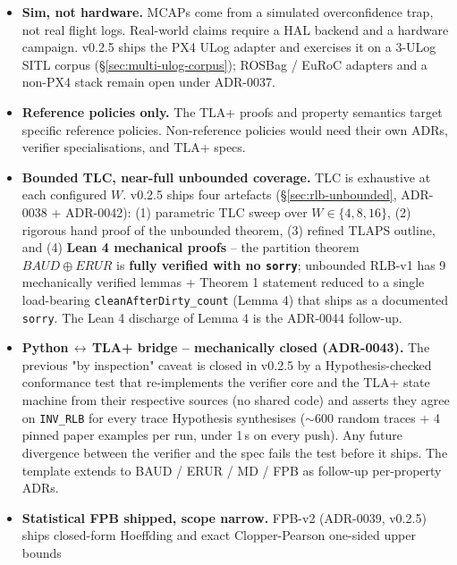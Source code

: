 \documentclass[acmsmall,nonacm=true,review=false]{acmart}
\theoremstyle{plain}
\begin{document}
\begin{itemize}
  \item \textbf{Sim, not hardware.} MCAPs come from a simulated
        overconfidence trap, not real flight logs. Real-world
        claims require a HAL backend and a hardware campaign.
        v0.2.5 ships the PX4 ULog adapter and exercises it on a
        3-ULog SITL corpus (\S\ref{sec:multi-ulog-corpus});
        ROSBag / EuRoC adapters and a non-PX4 stack remain open
        under ADR-0037.
  \item \textbf{Reference policies only.} The TLA+ proofs and
        property semantics target specific reference policies.
        Non-reference policies would need their own ADRs, verifier
        specialisations, and TLA+ specs.
  \item \textbf{Bounded TLC, near-full unbounded coverage.}
        TLC is exhaustive at each configured $W$. v0.2.5 ships
        four artefacts (\S\ref{sec:rlb-unbounded}, ADR-0038 +
        ADR-0042): (1) parametric TLC sweep over
        $W \in \{4, 8, 16\}$, (2) rigorous hand proof of the
        unbounded theorem, (3) refined TLAPS outline, and (4)
        \textbf{Lean 4 mechanical proofs} -- the partition theorem
        $\mathit{BAUD} \oplus \mathit{ERUR}$ is \textbf{fully
        verified with no \texttt{sorry}}; unbounded RLB-v1 has 9
        mechanically verified lemmas + Theorem 1 statement
        reduced to a single load-bearing
        \texttt{cleanAfterDirty\_count} (Lemma 4) that ships as a
        documented \texttt{sorry}. The Lean 4 discharge of Lemma
        4 is the ADR-0044 follow-up.
  \item \textbf{Python\,$\leftrightarrow$\,TLA+ bridge --
        mechanically closed (ADR-0043).} The previous "by
        inspection" caveat is closed in v0.2.5 by a
        Hypothesis-checked conformance test that re-implements
        the verifier core and the TLA+ state machine from their
        respective sources (no shared code) and asserts they
        agree on \texttt{INV\_RLB} for every trace Hypothesis
        synthesises ($\sim$600 random traces + 4 pinned paper
        examples per run, under 1\,s on every push). Any future
        divergence between the verifier and the spec fails the
        test before it ships. The template extends to BAUD /
        ERUR / MD / FPB as follow-up per-property ADRs.
  \item \textbf{Statistical FPB shipped, scope narrow.}
        FPB-v2 (ADR-0039, v0.2.5) ships closed-form Hoeffding
        and exact Clopper-Pearson one-sided upper bounds

\end{itemize}
\end{document}
